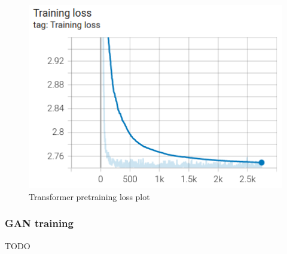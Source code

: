 \begin{figure}[ht]
	\centering
	\includegraphics[width=0.5\linewidth]{figures/pretrainingLossPlot.png}
	\caption{Transformer pretraining loss plot}
	\label{pretrainingLossPlot}
\end{figure}


\subsubsection{GAN training}  \label{ch:experimentsBb}

TODO


\newpage
